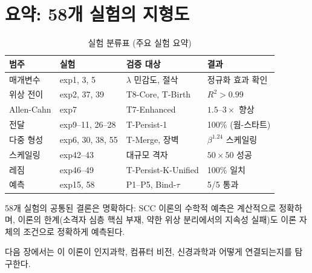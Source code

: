 \section{요약: 58개 실험의 지형도}
\label{sec:exp-summary}

\begin{table}[h]
\centering
\caption{실험 분류표 (주요 실험 요약)}
\label{tab:experiment-summary}
\small
\begin{tabular}{llll}
\toprule
\textbf{범주} & \textbf{실험} & \textbf{검증 대상} & \textbf{결과} \\
\midrule
매개변수 & exp1, 3, 5 & $\lambda$ 민감도, 절삭 & 정규화 효과 확인 \\
위상 전이 & exp2, 37, 39 & T8-Core, T-Birth & $R^2 > 0.99$ \\
Allen-Cahn & exp7 & T7-Enhanced & $1.5$--$3\times$ 향상 \\
전달 & exp9--11, 26--28 & T-Persist-1 & 100\% (웜-스타트) \\
다중 형성 & exp6, 30, 38, 55 & T-Merge, 장벽 & $\beta^{1.24}$ 스케일링 \\
스케일링 & exp42--43 & 대규모 격자 & $50 \times 50$ 성공 \\
레짐 & exp46--49 & T-Persist-K-Unified & 100\% 일치 \\
예측 & exp15, 58 & P1--P5, Bind-$\tau$ & 5/5 통과 \\
\bottomrule
\end{tabular}
\end{table}

58개 실험의 공통된 결론은 명확하다: SCC 이론의 수학적 예측은 계산적으로 정확하며, 이론의 한계(소격자 심층 핵심 부재, 약한 위상 분리에서의 지속성 실패)도 이론 자체의 조건으로 정확하게 예측된다.

다음 장에서는 이 이론이 인지과학, 컴퓨터 비전, 신경과학과 어떻게 연결되는지를 탐구한다.
